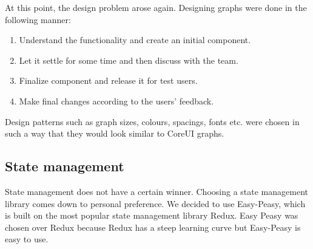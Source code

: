 At this point, the design problem arose again.
Designing graphs were done in the following manner:
\begin{enumerate}
    \item Understand the functionality and create an initial component.
    \item Let it settle for some time and then discuss with the team.
    \item Finalize component and release it for test users.
    \item Make final changes according to the users' feedback.
\end{enumerate}
Design patterns such as graph sizes, colours, spacings, fonts etc. were chosen in such a way that they would look similar to CoreUI graphs.

\subsection{State management}\label{subsec:state-management}
State management does not have a certain winner.
Choosing a state management library comes down to personal preference.
We decided to use Easy-Peasy, which is built on the most popular state management library Redux.
Easy Peasy was chosen over Redux because Redux has a steep learning curve but Easy-Peasy is easy to use.
